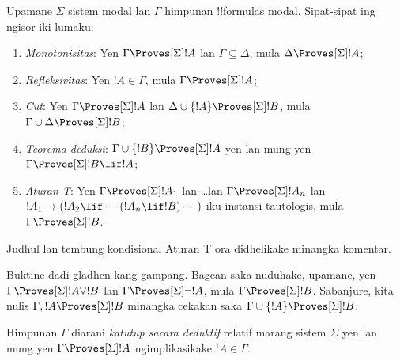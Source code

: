 \documentclass[../../../include/open-logic-section]{subfiles}
\begin{document}


\begin{prop}
  Upamane $\Sigma$ sistem modal lan $\Gamma$ himpunan !!{formula}s
  modal. Sipat-sipat ing ngisor iki lumaku:
  \begin{enumerate}
  \item{} \emph{Monotonisitas}: Yen
    $\Gamma \Proves[\Sigma] !A$ lan $\Gamma \subseteq \Delta$, mula
    $\Delta \Proves[\Sigma] !A$;
  \item{}
    \emph{Refleksivitas}: Yen $!A \in \Gamma$, mula $\Gamma
    \Proves[\Sigma] !A$;
  \item{} \emph{Cut}: Yen $\Gamma
    \Proves[\Sigma] !A$ lan $\Delta \cup \{!A\} \Proves[\Sigma] !B$,
    mula $\Gamma \cup \Delta \Proves[\Sigma] !B$;
  \item{} \emph{Teorema deduksi}: $\Gamma \cup \{!B\}
    \Proves[\Sigma] !A$ yen lan mung yen $\Gamma \Proves[\Sigma] !B \lif
      !A$;
  \item {} \emph{Aturan T}: Yen
    $\Gamma \Proves[\Sigma] !A_1$ lan \dots lan $\Gamma
    \Proves[\Sigma] !A_n$ lan $!A_1 \to (!A_2 \lif \cdots (!A_n \lif
    !B)\cdots)$ iku instansi tautologis, mula $\Gamma
    \Proves[\Sigma] !B$.
  \end{enumerate}
Judhul lan tembung kondisional Aturan T ora didhelikake minangka komentar.
\end{prop}

Buktine dadi gladhen kang gampang. Bagean
 saka 
nuduhake, upamane, yen $\Gamma \Proves[\Sigma] !A \lor !B$
lan $\Gamma \Proves[\Sigma] \lnot !A$, mula $\Gamma \Proves[\Sigma]
!B$. Sabanjure, kita nulis $\Gamma, !A \Proves[\Sigma] !B$
minangka cekakan saka $\Gamma \cup \{ !A\} \Proves[\Sigma] !B$.

\begin{defn}
  Himpunan $\Gamma$ diarani \emph{katutup sacara deduktif} relatif marang
  sistem $\Sigma$ yen lan mung yen $\Gamma \Proves[\Sigma] !A$
  ngimplikasikake $!A \in \Gamma$.
\end{defn}
\end{document}
